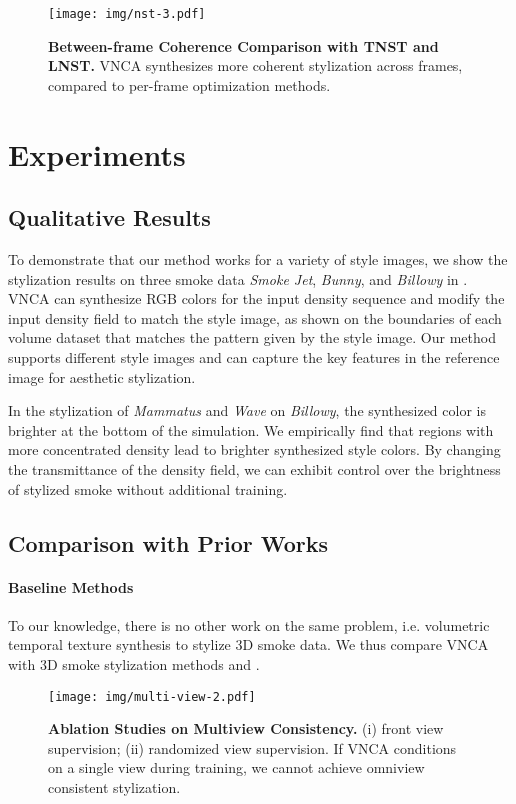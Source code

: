 
\begin{figure}
  \centering
  \texttt{[image: img/nst-3.pdf]}
  \caption{\textbf{Between-frame Coherence Comparison with TNST and LNST.} VNCA synthesizes more coherent stylization across frames, compared to per-frame optimization methods. }
  \label{fig:test}
\end{figure}




\section{Experiments}

\subsection{Qualitative Results} 
To demonstrate that our method works for a variety of style images, we show the stylization results on three smoke data \textit{Smoke Jet}, \textit{Bunny}, and \textit{Billowy} in . 
VNCA can synthesize RGB colors for the input density sequence and modify the input density field to match the style image, as shown on the boundaries of each volume dataset that matches the pattern given by the style image.  
Our method supports different style images and can capture the key features in the reference image for aesthetic stylization. 

In the stylization of \textit{Mammatus} and \textit{Wave} on \textit{Billowy}, the synthesized color is brighter at the bottom of the simulation. 
We empirically find that regions with more concentrated density lead to brighter synthesized style colors.
By changing the transmittance of the density field, we can exhibit control over the brightness of stylized smoke without additional training. 


\subsection{Comparison with Prior Works}
\paragraph{Baseline Methods}
To our knowledge, there is no other work on the same problem, i.e. volumetric temporal texture synthesis to stylize 3D smoke data. We thus compare VNCA with 3D smoke stylization methods \citet{kim19c} and \citet{kimlnst}. 


\begin{figure}
  \centering
  \texttt{[image: img/multi-view-2.pdf]}
  \caption{\textbf{Ablation Studies on Multiview Consistency. } (i) front view supervision; (ii) randomized view supervision. If VNCA conditions on a single view during training, we cannot achieve omniview consistent stylization. }
  \label{fig:multiview}
\end{figure}


